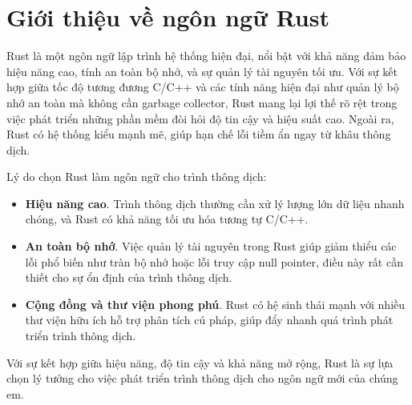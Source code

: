 \section{Giới thiệu về ngôn ngữ Rust}
    Rust là một ngôn ngữ lập trình hệ thống hiện đại, nổi bật với khả năng đảm bảo hiệu năng cao, tính an toàn bộ nhớ, và sự quản lý tài nguyên tối ưu. Với sự kết hợp giữa tốc độ tương đương C/C++ và các tính năng hiện đại như quản lý bộ nhớ an toàn mà không cần garbage collector, Rust mang lại lợi thế rõ rệt trong việc phát triển những phần mềm đòi hỏi độ tin cậy và hiệu suất cao. Ngoài ra, Rust có hệ thống kiểu mạnh mẽ, giúp hạn chế lỗi tiềm ẩn ngay từ khâu thông dịch. 

    Lý do chọn Rust làm ngôn ngữ cho trình thông dịch:

\begin{itemize}
    \item \textbf{Hiệu năng cao}. Trình thông dịch thường cần xử lý lượng lớn dữ liệu nhanh chóng, và Rust có khả năng tối ưu hóa tương tự C/C++. 
    \item \textbf{An toàn bộ nhớ}. Việc quản lý tài nguyên trong Rust giúp giảm thiểu các lỗi phổ biến như tràn bộ nhớ hoặc lỗi truy cập null pointer, điều này rất cần thiết cho sự ổn định của trình thông dịch. 
    \item \textbf{Cộng đồng và thư viện phong phú}. Rust có hệ sinh thái mạnh với nhiều thư viện hữu ích hỗ trợ phân tích cú pháp, giúp đẩy nhanh quá trình phát triển trình thông dịch.      
\end{itemize}

    Với sự kết hợp giữa hiệu năng, độ tin cậy và khả năng mở rộng, Rust là sự lựa chọn lý tưởng cho việc phát triển trình thông dịch cho ngôn ngữ mới của chúng em. 
